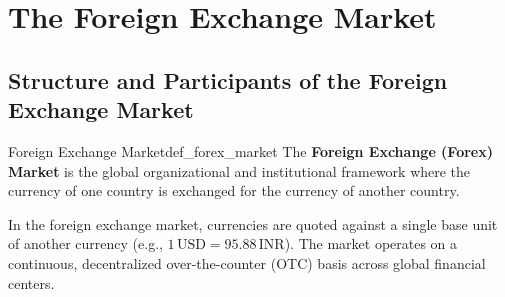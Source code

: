 \chapter{The Foreign Exchange Market}
\label{ch:foreign_exchange_market}

\section{Structure and Participants of the Foreign Exchange Market}

\begin{definition}{Foreign Exchange Market}{def_forex_market}
The \textbf{Foreign Exchange (Forex) Market} is the global organizational and institutional framework where the currency of one country is exchanged for the currency of another country.
\end{definition}

\noindent In the foreign exchange market, currencies are quoted against a single base unit of another currency (e.g., $1\,\text{USD} = 95.88\,\text{INR}$). The market operates on a continuous, decentralized over-the-counter (OTC) basis across global financial centers.

